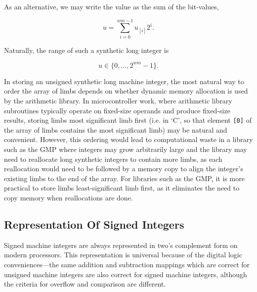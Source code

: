 As an alternative, we may write the value as the sum of the bit-values,

\begin{equation}
\label{eq:ccil0:sroi0:srou0:03}
u = \sum_{i=0}^{wm-1} u_{[i]} 2^{i} .
\end{equation}

Naturally, the range of such a synthetic long integer is

\begin{equation}
\label{eq:ccil0:sroi0:srou0:04}
u \in \{0, \ldots{} , 2^{wm} - 1 \} .
\end{equation}

In storing an unsigned synthetic long machine integer, the most natural way
to order the array of limbs depends on whether dynamic memory allocation is
used by the arithmetic library.  In microcontroller work, where arithmetic
library subroutines typically operate on fixed-size operands and produce
fixed-size results, storing 
limbs most significant limb first (i.e. in `C', so that element \texttt{[0]}
of the array of limbs contains the most significant limb) may be natural
and convenient.  However, this ordering would lead to computational waste in a library such
as the GMP \cite{bibref:s:gnumultipleprecisionarithmeticlibrary} where integers
may grow arbitrarily large and the library may need to reallocate long synthetic
integers to contain more limbs, as each reallocation would need to be followed
by a memory copy to align the integer's existing limbs to the end of the array.
For libraries such as the GMP, it is more practical to store limbs 
least-significant limb first, as it eliminates the need to copy memory 
when reallocations are done.



\subsection{Representation Of Signed Integers}
\label{ccil0:sroi0:sros0}

Signed machine integers are always represented in two's complement form on modern
processors.  This representation is universal because of the digital logic 
conveniences---the same addition and subtraction mappings which are correct 
for unsigned machine integers are also correct for signed machine integers, 
although the criteria for overflow and comparison are
different.

